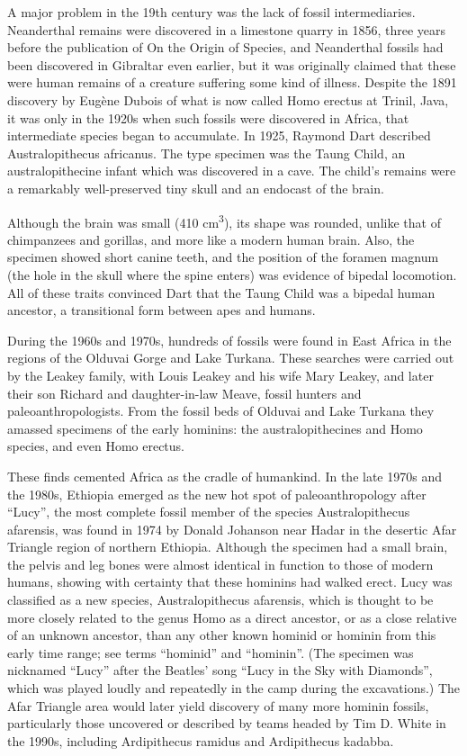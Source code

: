 A major problem in the 19th century was the lack of fossil intermediaries. Neanderthal remains were discovered in a limestone quarry in 1856, three years before the publication of On the Origin of Species, and Neanderthal fossils had been discovered in Gibraltar even earlier, but it was originally claimed that these were human remains of a creature suffering some kind of illness. Despite the 1891 discovery by Eugène Dubois of what is now called Homo erectus at Trinil, Java, it was only in the 1920s when such fossils were discovered in Africa, that intermediate species began to accumulate. In 1925, Raymond Dart described Australopithecus africanus. The type specimen was the Taung Child, an australopithecine infant which was discovered in a cave. The child's remains were a remarkably well-preserved tiny skull and an endocast of the brain.

Although the brain was small (410 cm\textsuperscript{3}), its shape was rounded, unlike that of chimpanzees and gorillas, and more like a modern human brain. Also, the specimen showed short canine teeth, and the position of the foramen magnum (the hole in the skull where the spine enters) was evidence of bipedal locomotion. All of these traits convinced Dart that the Taung Child was a bipedal human ancestor, a transitional form between apes and humans.

During the 1960s and 1970s, hundreds of fossils were found in East Africa in the regions of the Olduvai Gorge and Lake Turkana. These searches were carried out by the Leakey family, with Louis Leakey and his wife Mary Leakey, and later their son Richard and daughter-in-law Meave, fossil hunters and paleoanthropologists. From the fossil beds of Olduvai and Lake Turkana they amassed specimens of the early hominins: the australopithecines and Homo species, and even Homo erectus.

These finds cemented Africa as the cradle of humankind. In the late 1970s and the 1980s, Ethiopia emerged as the new hot spot of paleoanthropology after ``Lucy'', the most complete fossil member of the species Australopithecus afarensis, was found in 1974 by Donald Johanson near Hadar in the desertic Afar Triangle region of northern Ethiopia. Although the specimen had a small brain, the pelvis and leg bones were almost identical in function to those of modern humans, showing with certainty that these hominins had walked erect. Lucy was classified as a new species, Australopithecus afarensis, which is thought to be more closely related to the genus Homo as a direct ancestor, or as a close relative of an unknown ancestor, than any other known hominid or hominin from this early time range; see terms ``hominid'' and ``hominin''. (The specimen was nicknamed ``Lucy'' after the Beatles' song ``Lucy in the Sky with Diamonds'', which was played loudly and repeatedly in the camp during the excavations.) The Afar Triangle area would later yield discovery of many more hominin fossils, particularly those uncovered or described by teams headed by Tim D. White in the 1990s, including Ardipithecus ramidus and Ardipithecus kadabba.

